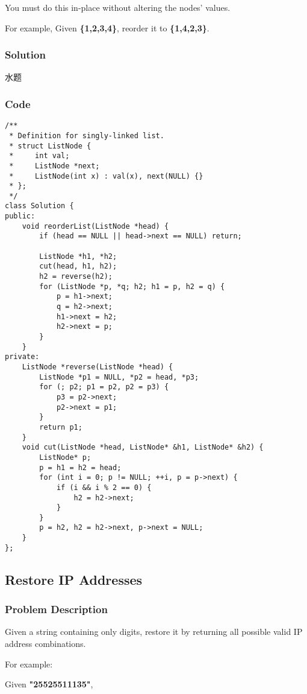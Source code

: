 \documentclass[courier]{article}
\begin{document}
\begin{CJK*}{UTF8}{gkai}
You must do this in-place without altering the nodes' values.

For example,
Given \textbf{\{1,2,3,4\}}, reorder it to \textbf{\{1,4,2,3\}}.



\subsubsection*{Solution}
水题

\subsubsection*{Code}
\begin{lstlisting}
/**
 * Definition for singly-linked list.
 * struct ListNode {
 *     int val;
 *     ListNode *next;
 *     ListNode(int x) : val(x), next(NULL) {}
 * };
 */
class Solution {
public:
    void reorderList(ListNode *head) {
        if (head == NULL || head->next == NULL) return;
        
        ListNode *h1, *h2;
        cut(head, h1, h2);
        h2 = reverse(h2);
        for (ListNode *p, *q; h2; h1 = p, h2 = q) {
            p = h1->next;
            q = h2->next;
            h1->next = h2;
            h2->next = p;
        }
    }
private:
    ListNode *reverse(ListNode *head) {
        ListNode *p1 = NULL, *p2 = head, *p3;
        for (; p2; p1 = p2, p2 = p3) {
            p3 = p2->next;
            p2->next = p1;
        }
        return p1;
    }
    void cut(ListNode *head, ListNode* &h1, ListNode* &h2) {
        ListNode* p;
        p = h1 = h2 = head;
        for (int i = 0; p != NULL; ++i, p = p->next) {
            if (i && i % 2 == 0) {
                h2 = h2->next;
            }
        }
        p = h2, h2 = h2->next, p->next = NULL;
    }
}; 
\end{lstlisting}


\subsection{ Restore IP Addresses }

\subsubsection*{Problem Description}
Given a string containing only digits, restore it by returning all possible valid IP address combinations.

For example:


Given \textbf{"25525511135"},


\end{CJK*}
\end{document}
